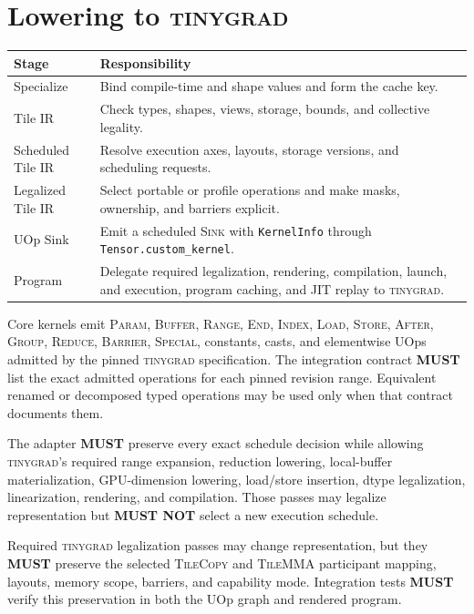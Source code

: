 \documentclass[10pt,letterpaper]{article}
\newcommand{\tinygrad}{\textsc{tinygrad}}
\newcommand{\op}[1]{\textsc{#1}}
\newcommand{\must}{\textbf{MUST}}
\newcommand{\mustnot}{\textbf{MUST NOT}}
\begin{document}
\section*{Lowering to \tinygrad{}}

\begin{center}
\begin{tabularx}{\textwidth}{@{}lY@{}}
\toprule
\textbf{Stage} & \textbf{Responsibility} \\
\midrule
Specialize & Bind compile-time and shape values and form the cache key. \\
Tile IR & Check types, shapes, views, storage, bounds, and collective legality. \\
Scheduled Tile IR & Resolve execution axes, layouts, storage versions, and
scheduling requests. \\
Legalized Tile IR & Select portable or profile operations and make masks,
ownership, and barriers explicit. \\
UOp Sink & Emit a scheduled \op{Sink} with \texttt{KernelInfo} through
\texttt{Tensor.custom\_kernel}. \\
Program & Delegate required legalization, rendering, compilation, launch, and
execution, program caching, and JIT replay to \tinygrad{}. \\
\bottomrule
\end{tabularx}
\end{center}

Core kernels emit \op{Param}, \op{Buffer}, \op{Range}, \op{End}, \op{Index},
\op{Load}, \op{Store}, \op{After}, \op{Group}, \op{Reduce}, \op{Barrier},
\op{Special}, constants, casts, and elementwise UOps admitted by the pinned
\tinygrad{} specification. The integration contract \must{} list the exact
admitted operations for each pinned revision range. Equivalent renamed or
decomposed typed operations may be used only when that contract documents them.

The adapter \must{} preserve every exact schedule decision while allowing
\tinygrad{}'s required range expansion, reduction lowering, local-buffer
materialization, GPU-dimension lowering, load/store insertion, dtype
legalization, linearization, rendering, and compilation. Those passes may
legalize representation but \mustnot{} select a new execution schedule.

Required \tinygrad{} legalization passes may change representation, but they
\must{} preserve the selected \op{TileCopy} and \op{TileMMA} participant
mapping, layouts, memory scope, barriers, and capability mode. Integration tests
\must{} verify this preservation in both the UOp graph and rendered program.
\end{document}
